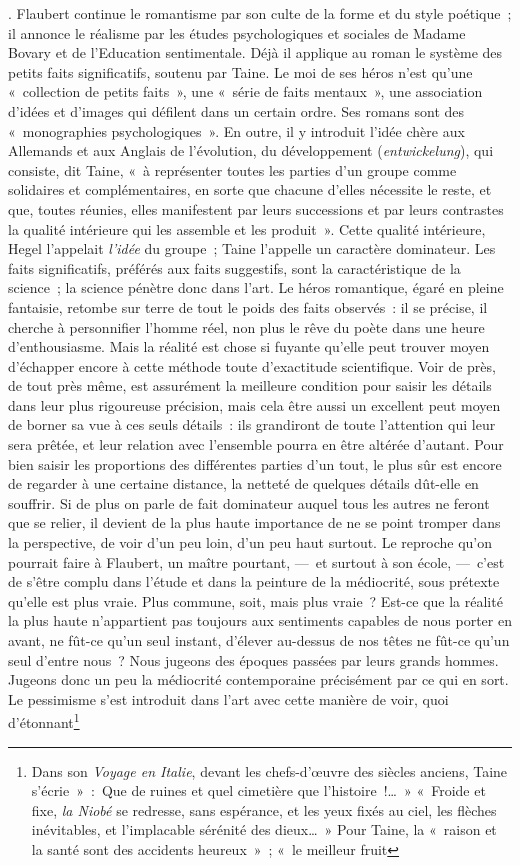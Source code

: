 \documentclass[french,twoside]{book} %
\begin{document}
{}. Flaubert continue le romantisme par son culte de la forme et du style poétique ; il annonce le réalisme par les études psychologiques et sociales de Madame Bovary et de l’Education sentimentale. Déjà il applique au roman le système des petits faits significatifs, soutenu par Taine. Le moi de ses héros n’est qu’une « collection de petits faits », une « série de faits mentaux », une association d’idées et d’images qui défilent dans un certain ordre. Ses romans sont des « monographies psychologiques ». En outre, il y introduit l’idée chère aux Allemands et aux Anglais de l’évolution, du développement (\emph{entwickelung}), qui consiste, dit Taine, « à représenter toutes les parties d’un groupe comme solidaires et complémentaires, en sorte que chacune d’elles nécessite le reste, et que, toutes réunies, elles manifestent par leurs successions et par leurs contrastes la qualité intérieure qui les assemble et les produit ». Cette qualité intérieure, Hegel l’appelait \emph{l’idée} du groupe ; Taine l’appelle un caractère dominateur. Les faits significatifs, préférés aux faits suggestifs, sont la caractéristique de la science ; la science pénètre donc dans l’art. Le héros romantique, égaré en pleine fantaisie, retombe sur terre de tout le poids des faits observés : il se précise, il cherche à personnifier l’homme réel, non plus le rêve du poète dans une heure d’enthousiasme. Mais la réalité est chose si fuyante qu’elle peut trouver moyen d’échapper encore à cette méthode toute d’exactitude scientifique. Voir de près, de tout près même, est assurément la meilleure condition pour saisir les détails dans leur plus rigoureuse précision, mais cela être aussi un excellent peut moyen de borner sa vue à ces seuls détails : ils grandiront de toute l’attention qui leur sera prêtée, et leur relation avec l’ensemble pourra en être altérée d’autant. Pour bien saisir les proportions des différentes parties d’un tout, le plus sûr est encore de regarder à une certaine distance, la netteté de quelques détails dût-elle en souffrir. Si de plus on parle de fait dominateur auquel tous les autres ne feront que se relier, il devient de la plus haute importance de ne se point tromper dans la perspective, de voir d’un peu loin, d’un peu haut surtout. Le reproche qu’on pourrait faire à Flaubert, un maître pourtant, — et surtout à son école, — c’est de s’être complu dans l’étude et dans la peinture de la médiocrité, sous prétexte qu’elle est plus vraie. Plus commune, soit, mais plus vraie ? Est-ce que la réalité la plus haute n’appartient pas toujours aux sentiments capables de nous porter en avant, ne fût-ce qu’un seul instant, d’élever au-dessus de nos têtes ne fût-ce qu’un seul d’entre nous ? Nous jugeons des époques passées par leurs grands hommes. Jugeons donc un peu la médiocrité contemporaine précisément par ce qui en sort. Le pessimisme s’est introduit dans l’art avec cette manière de voir, quoi d’étonnant\footnote{ Dans son \emph{Voyage en Italie}, devant les chefs-d’œuvre des siècles anciens, Taine s’écrie » : Que de ruines et quel cimetière que l’histoire !… » « Froide et fixe, \emph{la Niobé} se redresse, sans espérance, et les yeux fixés au ciel, les flèches inévitables, et l’implacable sérénité des dieux… » Pour Taine, la « raison et la santé sont des accidents heureux » ; « le meilleur fruit }
\end{document}
